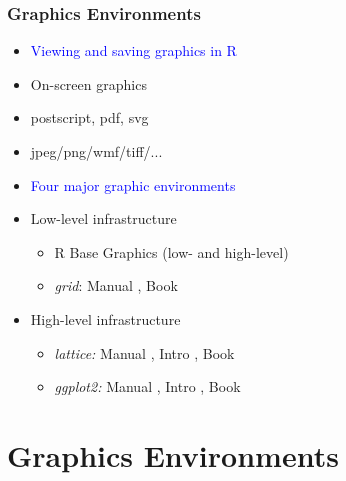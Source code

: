 \documentclass{beamer}
\newcommand{\Rpackage}[1]{{\textit{#1}}}
\begin{document}
\begin{frame}[containsverbatim]  
	\frametitle{Graphics Environments}
\begin{itemize}
        \item[] \hspace{-0.8cm} \textcolor{blue}{Viewing and saving graphics in R}
        \item On-screen graphics
        \item postscript, pdf, svg
        \item jpeg/png/wmf/tiff/...
\end{itemize}
\begin{itemize}
        \item[] \hspace{-0.8cm} \textcolor{blue}{Four major graphic environments}
        \item Low-level infrastructure
        \begin{itemize}
                \item R Base Graphics (low- and high-level)
                \item \Rpackage{grid}: Manual \href{http://www.stat.auckland.ac.nz/~paul/grid/grid.html}{{}}, Book \href{http://www.stat.auckland.ac.nz/~paul/RGraphics/rgraphics.html}{{}}
        \end{itemize}
        \item High-level infrastructure
        \begin{itemize}
                \item \Rpackage{lattice:} Manual \href{http://lmdvr.r-forge.r-project.org}{{}}, Intro \href{http://www.his.sunderland.ac.uk/~cs0her/Statistics/UsingLatticeGraphicsInR.htm}{{}}, Book \href{http://www.amazon.com/Lattice-Multivariate-Data-Visualization-Use/dp/0387759689}{{}} 
                \item \Rpackage{ggplot2:} Manual \href{http://docs.ggplot2.org/current/}{{}}, Intro \href{http://www.ling.upenn.edu/~joseff/rstudy/summer2010_ggplot2_intro.html}{{}}, Book \href{http://had.co.nz/ggplot2/book/}{{}} 
        \end{itemize}
\end{itemize}
\end{frame}
\section{Graphics Environments}
\end{document}
